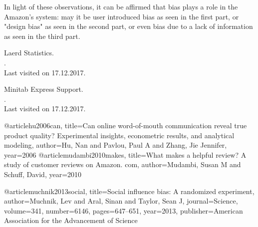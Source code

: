 \documentclass[11pt]{article}
\begin{document}
In light of these observations, it can be affirmed that bias plays a role in the Amazon's system: may it be user introduced bias as seen in the first part, or "design bias" as seen in the second part, or even bias due to a lack of information as seen in the third part.

\nocite{laerd}
\nocite{minitab}



\begin{thebibliography}{}

 Laerd Statistics.\\
.\\
\newblock Last visited on 17.12.2017.

Minitab Express Support.\\
.\\
\newblock Last visited on 17.12.2017.

@article{hu2006can,
  title={Can online word-of-mouth communication reveal true product quality? Experimental insights, econometric results, and analytical modeling},
  author={Hu, Nan and Pavlou, Paul A and Zhang, Jie Jennifer},
  year={2006}
}
@article{mudambi2010makes,
  title={What makes a helpful review? A study of customer reviews on Amazon. com},
  author={Mudambi, Susan M and Schuff, David},
  year={2010}
}

@article{muchnik2013social,
  title={Social influence bias: A randomized experiment},
  author={Muchnik, Lev and Aral, Sinan and Taylor, Sean J},
  journal={Science},
  volume={341},
  number={6146},
  pages={647--651},
  year={2013},
  publisher={American Association for the Advancement of Science}
}

\end{thebibliography}
\end{document}
